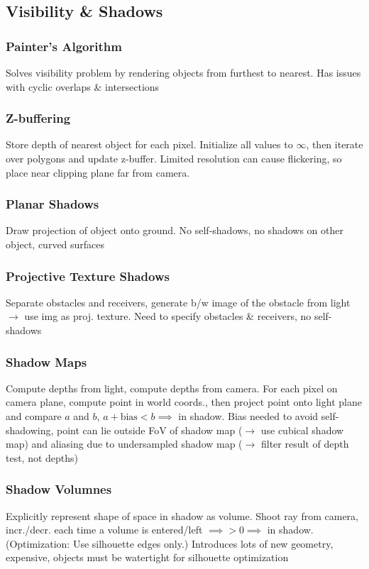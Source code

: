 \documentclass[a4paper,10pt]{article}
\begin{document}
\subsection{Visibility \& Shadows}
\subsubsection{Painter's Algorithm} Solves visibility problem by rendering objects from furthest to nearest. Has issues with cyclic overlaps \& intersections
\subsubsection{Z-buffering} Store depth of nearest object for each pixel. Initialize all values to \( \infty \), then iterate over polygons and update z-buffer.
Limited resolution can cause flickering, so place near clipping plane far from camera.

\subsubsection{Planar Shadows} Draw projection of object onto ground. No self-shadows, no shadows on other object, curved surfaces
\subsubsection{Projective Texture Shadows} Separate obstacles and receivers, generate b/w image of the obstacle from light \( \to  \) use img as proj. texture. Need to specify obstacles \& receivers, no self-shadows
\subsubsection{Shadow Maps} Compute depths from light, compute depths from camera. For each pixel on camera plane, compute point in world coords., then project point onto light plane and compare \( a \) and \( b \), \( a + \text{bias} < b \implies \) in shadow. Bias needed to avoid self-shadowing, point can lie outside FoV of shadow map (\( \to \) use cubical shadow map) and aliasing due to undersampled shadow map (\( \to  \) filter result of depth test, not depths)

\subsubsection{Shadow Volumnes} Explicitly represent shape of space in shadow as volume. Shoot ray from camera, incr./decr. each time a volume is entered/left \( \implies > 0 \implies \) in shadow. (Optimization: Use silhouette edges only.) Introduces lots of new geometry, expensive, objects must be watertight for silhouette optimization
\end{document}

